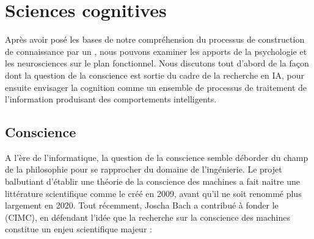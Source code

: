 \section{Sciences cognitives}

\noindent
Après avoir posé les bases de notre compréhension du processus de construction de connaissance par un , nous pouvons examiner les apports de la psychologie et les neurosciences sur le plan fonctionnel. 
Nous discutons tout d'abord de la façon dont la question de la conscience est sortie du cadre de la recherche en IA, pour ensuite envisager la cognition  comme un ensemble de processus de traitement de l’information produisant des comportements intelligents.

 


\subsection{Conscience}
\label{sec:conscience}

\noindent
A l'ère de l'informatique, la question de la conscience semble déborder du champ de la philosophie pour se rapprocher du domaine de l'ingénierie. 
Le projet balbutiant d'établir une théorie de la conscience des machines a fait naitre une littérature scientifique comme le  créé en 2009, avant qu'il ne soit renommé plus largement  en 2020. 
Tout récemment, Joscha Bach a contribué à fonder le  (CIMC), en défendant l'idée que la recherche sur la conscience des machines constitue un enjeu scientifique majeur :

